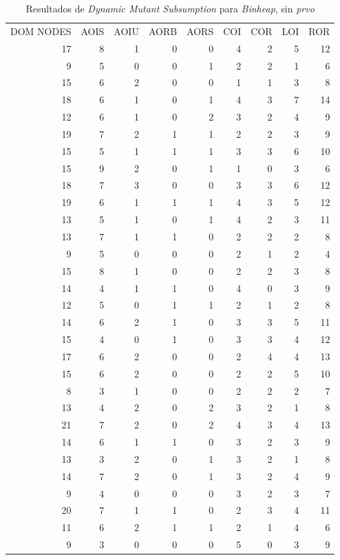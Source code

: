 \begin{table}[]
	\caption{Resultados de \emph{Dynamic Mutant Subsumption} para \emph{Binheap}, sin \emph{prvo}}
	\label{tables.results.subsumption.binheap.noprvo}
	\centering
	\scriptsize
	\def\arraystretch{0.95}
	\setlength\tabcolsep{0.5mm}
	\begin{tabular}{rrrrrrrrr}
		DOM NODES & AOIS & AOIU & AORB & AORS & COI & COR & LOI & ROR \\
		17 & 8 & 1 & 0 & 0 & 4 & 2 & 5 & 12 \\
		9 & 5 & 0 & 0 & 1 & 2 & 2 & 1 & 6 \\
		15 & 6 & 2 & 0 & 0 & 1 & 1 & 3 & 8 \\
		18 & 6 & 1 & 0 & 1 & 4 & 3 & 7 & 14 \\
		12 & 6 & 1 & 0 & 2 & 3 & 2 & 4 & 9 \\
		19 & 7 & 2 & 1 & 1 & 2 & 2 & 3 & 9 \\
		15 & 5 & 1 & 1 & 1 & 3 & 3 & 6 & 10 \\
		15 & 9 & 2 & 0 & 1 & 1 & 0 & 3 & 6 \\
		18 & 7 & 3 & 0 & 0 & 3 & 3 & 6 & 12 \\
		19 & 6 & 1 & 1 & 1 & 4 & 3 & 5 & 12 \\
		13 & 5 & 1 & 0 & 1 & 4 & 2 & 3 & 11 \\
		13 & 7 & 1 & 1 & 0 & 2 & 2 & 2 & 8 \\
		9 & 5 & 0 & 0 & 0 & 2 & 1 & 2 & 4 \\
		15 & 8 & 1 & 0 & 0 & 2 & 2 & 3 & 8 \\
		14 & 4 & 1 & 1 & 0 & 4 & 0 & 3 & 9 \\
		12 & 5 & 0 & 1 & 1 & 2 & 1 & 2 & 8 \\
		14 & 6 & 2 & 1 & 0 & 3 & 3 & 5 & 11 \\
		15 & 4 & 0 & 1 & 0 & 3 & 3 & 4 & 12 \\
		17 & 6 & 2 & 0 & 0 & 2 & 4 & 4 & 13 \\
		15 & 6 & 2 & 0 & 0 & 2 & 2 & 5 & 10 \\
		8 & 3 & 1 & 0 & 0 & 2 & 2 & 2 & 7 \\
		13 & 4 & 2 & 0 & 2 & 3 & 2 & 1 & 8 \\
		21 & 7 & 2 & 0 & 2 & 4 & 3 & 4 & 13 \\
		14 & 6 & 1 & 1 & 0 & 3 & 2 & 3 & 9 \\
		13 & 3 & 2 & 0 & 1 & 3 & 2 & 1 & 8 \\
		14 & 7 & 2 & 0 & 1 & 3 & 2 & 4 & 9 \\
		9 & 4 & 0 & 0 & 0 & 3 & 2 & 3 & 7 \\
		20 & 7 & 1 & 1 & 0 & 2 & 3 & 4 & 11 \\
		11 & 6 & 2 & 1 & 1 & 2 & 1 & 4 & 6 \\
		9 & 3 & 0 & 0 & 0 & 5 & 0 & 3 & 9
	\end{tabular}
\end{table}

